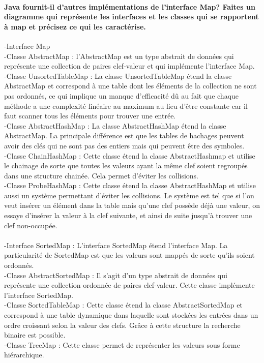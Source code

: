 \documentclass[a4paper]{article}
\begin{document}
\paragraph{Java fournit-il d'autres implémentations de l'interface Map? Faites un diagramme qui représente les interfaces et les classes qui se rapportent à map et précisez ce qui les caractérise.}
-Interface Map\\
-Classe AbstractMap : l'AbstractMap est un type abstrait de données qui représente une collection de paires clef-valeur et qui implémente l'interface Map.\\
-Classe UnsortedTableMap : La classe UnsortedTableMap étend la classe AbstractMap et correspond à une table dont les éléments de la collection ne sont pas ordonnés, ce qui implique un manque d'efficacité dû au fait que chaque méthode a une complexité linéaire au maximum au lieu d'être constante car il faut scanner tous les éléments pour trouver une entrée. \\
-Classe AbstractHashMap : La classe AbstractHashMap étend la classe AbstractMap. La principale différence est que les tables de hachages peuvent avoir des clés qui ne sont pas des entiers mais qui peuvent être des symboles.  \\ 
-Classe ChainHashMap : Cette classe étend la classe AbstractHashmap et utilise le chainage de sorte que toutes les valeurs ayant la même clef soient regroupés dans une structure chainée. Cela permet d'éviter les collisions.\\
-Classe ProbeHashMap : Cette classe étend la classe AbstractHashMap et utilise aussi un système permettant d'éviter les collisions. Le système est tel que si l'on veut insérer un élément dans la table mais qu'une clef possède déjà une valeur, on essaye d'insérer la valeur à la clef suivante, et ainsi de suite jusqu'à trouver une clef non-occupée. \\ 
\\
-Interface SortedMap : L'interface SortedMap étend l'interface Map. La particularité de SortedMap est que les valeurs sont mappés de sorte qu'ils soient ordonnés.\\
-Classe AbstractSortedMap : Il s'agit d'un type abstrait de données qui représente une collection ordonnée de paires clef-valeur. Cette classe implémente l'interface SortedMap.\\
-Classe SortedTableMap : Cette classe étend la classe AbstractSortedMap et correspond à une table dynamique dans laquelle sont stockées les entrées dans un ordre croissant selon la valeur des clefs. Grâce à cette structure la recherche binaire est possible.  \\
-Classe TreeMap : Cette classe permet de représenter les valeurs sous forme hiérarchique. \\ 
\end{document}
